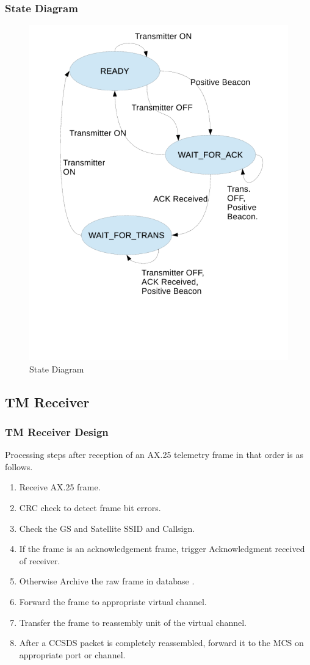 \documentclass{beamer}
\begin{document}
\begin{frame}
\frametitle{State Diagram}
\begin{figure}
\includegraphics[scale = 0.35 ]{state.pdf}
\caption{State Diagram}
\label{fig1:state}
\end{figure}
\end{frame}

\subsection{TM Receiver}
\begin{frame}
\frametitle{TM Receiver Design}
Processing steps after reception of an AX.25 telemetry frame in that order is as follows. 
\begin{enumerate}
\item Receive AX.25 frame.
\item CRC check to detect frame bit errors.
\item Check the GS and Satellite SSID and Callsign.
\item If the frame is an acknowledgement frame, trigger Acknowledgment received of receiver.
\item Otherwise Archive the raw frame in database .
\item Forward the frame to appropriate virtual channel.
\item Transfer the frame to reassembly unit of the virtual channel.
\item After a CCSDS packet is completely reassembled, forward it to the MCS on appropriate port or channel. 
\end{enumerate}

\end{frame}
\end{document}
